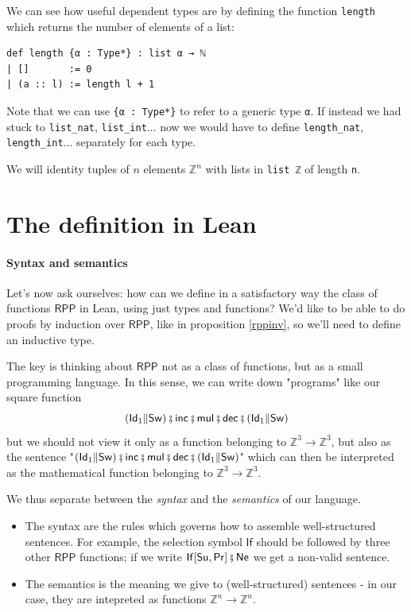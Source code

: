 \documentclass{book}
\theoremstyle{definition}
\theoremstyle{remark}
\theoremstyle{plain}
\newcommand{\ZZ}{\mathbb{Z}}
\newcommand{\RPP}{\mathsf{RPP}}
\newcommand{\rppId}{\mathsf{Id}}
\newcommand{\rppNe}{\mathsf{Ne}}
\newcommand{\rppSu}{\mathsf{Su}}
\newcommand{\rppPr}{\mathsf{Pr}}
\newcommand{\rppSw}{\mathsf{Sw}}
\newcommand{\rppCo}{\fatsemi}
\newcommand{\rppPa}{\Vert}
\newcommand{\rppIf}{\mathsf{If}}
\newcommand{\rppinc}{\mathsf{inc}}
\newcommand{\rppdec}{\mathsf{dec}}
\newcommand{\rppmul}{\mathsf{mul}}
\begin{document}
We can see how useful dependent types are by defining the function \lstinline{length}
which returns the number of elements of a list:
\begin{lstlisting}
def length {α : Type*} : list α → ℕ
| []       := 0
| (a :: l) := length l + 1
\end{lstlisting}
Note that we can use \lstinline|{α : Type*}| to refer to a generic type \lstinline{α}.
If instead we had stuck to \lstinline{list_nat}, \lstinline{list_int}...
now we would have to define \lstinline{length_nat}, \lstinline{length_int}... separately for each type.

We will identity tuples of $n$ elements $\ZZ^n$ with lists in \lstinline{list ℤ} of length \lstinline{n}.

\section{The definition in Lean}

\paragraph{Syntax and semantics}
Let's now ask ourselves: how can we define in a satisfactory way the class of functions $\RPP$ in Lean,
using just types and functions?
We'd like to be able to do proofs by induction over $\RPP$, like in proposition \ref{rppinv}, so we'll need to define an inductive type.

The key is thinking about $\RPP$ not as a class of functions, but as a small programming language.
In this sense, we can write down "programs" like our square function
\[(\rppId_1 \rppPa \rppSw) \rppCo \rppinc \rppCo \rppmul \rppCo \rppdec \rppCo (\rppId_1 \rppPa \rppSw)\]
but we should not view it only as a function belonging to $\ZZ^3 \to \ZZ^3$,
but also as the sentence
"$(\rppId_1 \rppPa \rppSw) \rppCo \rppinc \rppCo \rppmul \rppCo \rppdec \rppCo (\rppId_1 \rppPa \rppSw)$"
which can then be interpreted as the mathematical function belonging to $\ZZ^3 \to \ZZ^3$.

We thus separate between the \textit{syntax} and the \textit{semantics} of our language.
\begin{itemize}
\item The syntax are the rules which governs how to assemble well-structured sentences.
For example, the selection symbol $\rppIf$ should be followed by three other $\RPP$ functions;
if we write $\rppIf[\rppSu, \rppPr] \rppCo \rppNe$ we get a non-valid sentence.
\item The semantics is the meaning we give to (well-structured) sentences -
in our case, they are intepreted as functions $\ZZ^n \to \ZZ^n$.
\end{itemize}
\end{document}
